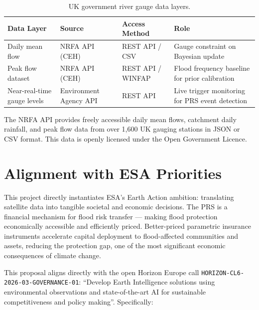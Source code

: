 \documentclass[11pt,a4paper]{article}
\begin{document}
\begin{table}[H]
\centering
\caption{UK government river gauge data layers.}
\begin{tabular}{p{3.0cm} p{2.7cm} p{2.4cm} p{4.0cm}}
\toprule
\textbf{Data Layer} & \textbf{Source} & \textbf{Access Method} & \textbf{Role} \\
\midrule
Daily mean flow & NRFA API (CEH) & REST API / CSV & Gauge constraint on Bayesian
update \\
\addlinespace
Peak flow dataset & NRFA API (CEH) & REST API / WINFAP & Flood frequency baseline
for prior calibration \\
\addlinespace
Near-real-time gauge levels & Environment Agency API & REST API & Live trigger
monitoring for PRS event detection \\
\bottomrule
\end{tabular}
\end{table}

The NRFA API provides freely accessible daily mean flows, catchment daily rainfall,
and peak flow data from over 1{,}600 UK gauging stations in JSON or CSV format.
This data is openly licensed under the Open Government Licence.

\section{Alignment with ESA Priorities}

This project directly instantiates ESA's Earth Action ambition: translating
satellite data into tangible societal and economic decisions. The PRS is a
financial mechanism for flood risk transfer --- making flood protection
economically accessible and efficiently priced. Better-priced parametric insurance
instruments accelerate capital deployment to flood-affected communities and assets,
reducing the protection gap, one of the most significant economic consequences of
climate change.

This proposal aligns directly with the open Horizon Europe call
\texttt{HORIZON-CL6-2026-03-GOVERNANCE-01}: ``Develop Earth Intelligence solutions
using environmental observations and state-of-the-art AI for sustainable
competitiveness and policy making''. Specifically:
\end{document}
